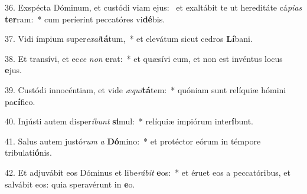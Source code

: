 36. Exspécta Dóminum, et custódi viam ejus: \dag\  et exaltábit te ut hereditáte cá\textit{pi}\textit{as} \textbf{ter}ram:~*  cum períerint peccatóres vi\textbf{dé}bis.\

37. Vidi ímpium super\textit{ex}\textit{al}\textbf{tá}tum,~*  et elevátum sicut cedros \textbf{Lí}bani.\

38. Et transívi, et ec\textit{ce} \textit{non} \textbf{e}rat:~*  et quæsívi eum, et non est invéntus locus \textbf{e}jus.\

39. Custódi innocéntiam, et vide \textit{æ}\textit{qui}\textbf{tá}tem:~*  quóniam sunt relíquiæ hómini pa\textbf{cí}fico.\

40. Injústi autem disper\textit{í}\textit{bunt} \textbf{si}mul:~*  relíquiæ impiórum inter\textbf{í}bunt.\

41. Salus autem justó\textit{rum} \textit{a} \textbf{Dó}mino:~*  et protéctor eórum in témpore tribulati\textbf{ó}nis.\

42. Et adjuvábit eos Dóminus et libe\textit{rá}\textit{bit} \textbf{e}os:~*  et éruet eos a peccatóribus, et salvábit eos: quia speravérunt in \textbf{e}o.\

